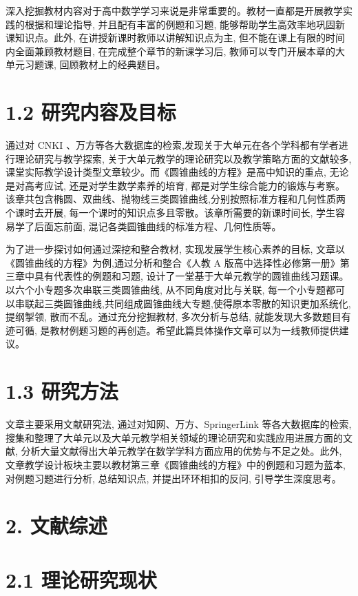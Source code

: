 \documentclass[10pt]{article}
\begin{document}
深入挖掘教材内容对于高中数学学习来说是非常重要的。教材一直都是开展教学实践的根据和理论指导, 并且配有丰富的例题和习题, 能够帮助学生高效率地巩固新课知识点。此外, 在讲授新课时教师以讲解知识点为主, 但不能在课上有限的时间内全面兼顾教材题目, 在完成整个章节的新课学习后, 教师可以专门开展本章的大单元习题课, 回顾教材上的经典题目。

\section*{1.2 研究内容及目标}

通过对 CNKI 、万方等各大数据库的检索,发现关于大单元在各个学科都有学者进行理论研究与教学探索, 关于大单元教学的理论研究以及教学策略方面的文献较多,课堂实际教学设计类型文章较少。而《圆锥曲线的方程》是高中知识的重点, 无论是对高考应试, 还是对学生数学素养的培育, 都是对学生综合能力的锻炼与考察。该章共包含椭圆、双曲线、抛物线三类圆锥曲线,分别按照标准方程和几何性质两个课时去开展, 每一个课时的知识点多且零散。该章所需要的新课时间长, 学生容易学了后面忘前面, 混记各类圆锥曲线的标准方程、几何性质等。

为了进一步探讨如何通过深挖和整合教材, 实现发展学生核心素养的目标, 文章以《圆锥曲线的方程》为例,通过分析和整合《人教 A 版高中选择性必修第一册》第三章中具有代表性的例题和习题, 设计了一堂基于大单元教学的圆锥曲线习题课。以六个小专题多次串联三类圆锥曲线, 从不同角度对比与关联, 每一个小专题都可以串联起三类圆锥曲线,共同组成圆锥曲线大专题,使得原本零散的知识更加系统化, 提纲掣领, 散而不乱。通过充分挖掘教材, 多次分析与总结, 就能发现大多数题目有迹可循, 是教材例题习题的再创造。希望此篇具体操作文章可以为一线教师提供建议。

\section*{1.3 研究方法}

文章主要采用文献研究法, 通过对知网、万方、SpringerLink 等各大数据库的检索, 搜集和整理了大单元以及大单元教学相关领域的理论研究和实践应用进展方面的文献, 分析大量文献得出大单元教学在数学学科方面应用的优势与不足之处。此外, 文章教学设计板块主要以教材第三章《圆锥曲线的方程》中的例题和习题为蓝本, 对例题习题进行分析, 总结知识点, 并提出环环相扣的反问, 引导学生深度思考。

\section*{2. 文献综述}

\section*{2.1 理论研究现状}
\end{document}
